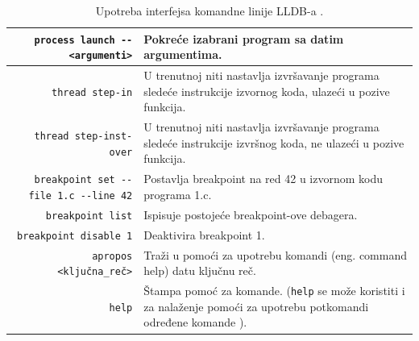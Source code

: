 \documentclass[a4paper]{article}
\begin{document}
\begin{table}[h!]
	\begin{center}
		\caption{Upotreba interfejsa komandne linije LLDB-a \cite{lldb_to_gdb_map}\cite{lldb_tutorial}.}
		\small
		\begin{tabular}{|r|p{5cm}|}
			\hline
			\verb|process launch -- <argumenti>|
			& Pokreće izabrani program sa datim argumentima. \\ \hline
			\verb|thread step-in|
			& U trenutnoj niti nastavlja izvršavanje programa sledeće instrukcije izvornog koda, ulazeći u pozive funkcija.  \\ \hline
			\verb|thread step-inst-over|
			& U trenutnoj niti nastavlja izvršavanje programa sledeće instrukcije izvršnog koda, ne ulazeći u pozive funkcija. \\ \hline
			\verb|breakpoint set --file 1.c --line 42|
			& Postavlja breakpoint na red 42 u izvornom kodu programa 1.c. \\ \hline
			\verb|breakpoint list|
			& Ispisuje postojeće breakpoint-ove debagera. \\ \hline
			\verb|breakpoint disable 1|
			& Deaktivira breakpoint 1. \\ \hline
			\verb|apropos <ključna_reč>|
			& Traži u pomoći za upotrebu komandi (eng. command help) datu ključnu reč. \\ \hline
			\verb|help|
			& Štampa pomoć za komande. (\verb|help| se može koristiti i za nalaženje pomoći za upotrebu potkomandi određene komande \cite{apple_lldb_comms}). \\ \hline
		\end{tabular}
		\label{tab:tabela3}
	\end{center}
\end{table}

\end{document}
